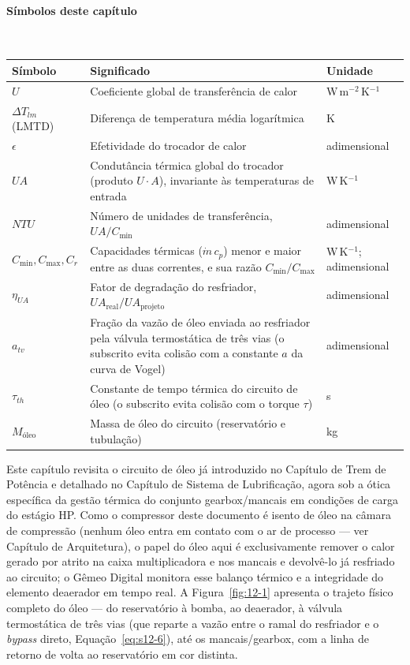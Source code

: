 \documentclass[12pt,a4paper]{article}
\numberwithin{equation}{section}
\numberwithin{table}{section}
\numberwithin{figure}{section}
\begin{document}
\paragraph{Símbolos deste capítulo}\mbox{}\\[-0.5em]
{\small
\begin{longtable}{>{\raggedright\arraybackslash}p{2.6cm} >{\raggedright\arraybackslash}p{9.2cm} >{\raggedright\arraybackslash}p{2.6cm}}
	\toprule
	\textbf{Símbolo} & \textbf{Significado} & \textbf{Unidade} \\ \midrule
	\endhead
	$U$ & Coeficiente global de transferência de calor & W\,m$^{-2}$\,K$^{-1}$ \\
	$\Delta T_{lm}$ (LMTD) & Diferença de temperatura média logarítmica & K \\
	$\epsilon$ & Efetividade do trocador de calor & adimensional \\
	$UA$ & Condutância térmica global do trocador (produto $U \cdot A$), invariante às temperaturas de entrada & W\,K$^{-1}$ \\
	$NTU$ & Número de unidades de transferência, $UA/C_{\min}$ & adimensional \\
	$C_{\min}, C_{\max}, C_r$ & Capacidades térmicas ($\dot{m}\,c_p$) menor e maior entre as duas correntes, e sua razão $C_{\min}/C_{\max}$ & W\,K$^{-1}$; adimensional \\
	$\eta_{UA}$ & Fator de degradação do resfriador, $UA_{\text{real}}/UA_{\text{projeto}}$ & adimensional \\
	$a_{tv}$\dag & Fração da vazão de óleo enviada ao resfriador pela válvula termostática de três vias (o subscrito evita colisão com a constante $a$ da curva de Vogel) & adimensional \\
	$\tau_{th}$\dag & Constante de tempo térmica do circuito de óleo (o subscrito evita colisão com o torque $\tau$) & s \\
	$M_{\text{óleo}}$ & Massa de óleo do circuito (reservatório e tubulação) & kg \\
	\bottomrule
\end{longtable}
}





	Este capítulo revisita o circuito de óleo já introduzido no Capítulo de Trem de Potência e detalhado no Capítulo de Sistema de Lubrificação, agora sob a ótica específica da gestão térmica do conjunto gearbox/mancais em condições de carga do estágio HP. Como o compressor deste documento é isento de óleo na câmara de compressão (nenhum óleo entra em contato com o ar de processo — ver Capítulo de Arquitetura), o papel do óleo aqui é exclusivamente remover o calor gerado por atrito na caixa multiplicadora e nos mancais e devolvê-lo já resfriado ao circuito; o Gêmeo Digital monitora esse balanço térmico e a integridade do elemento deaerador em tempo real. A Figura~\ref{fig:12-1} apresenta o trajeto físico completo do óleo — do reservatório à bomba, ao deaerador, à válvula termostática de três vias (que reparte a vazão entre o ramal do resfriador e o \textit{bypass} direto, Equação~\eqref{eq:s12-6}), até os mancais/gearbox, com a linha de retorno de volta ao reservatório em cor distinta.
\end{document}
